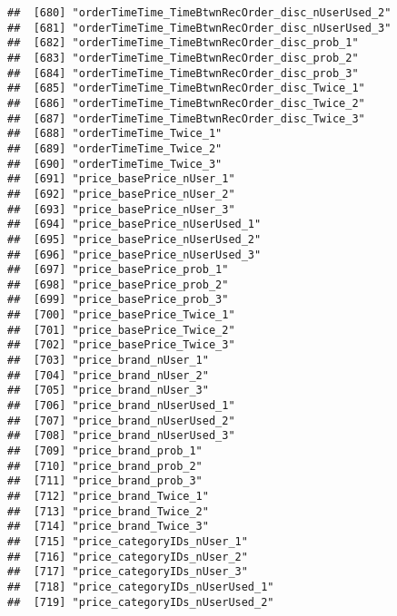 \documentclass[10pt]{report}
\begin{document}
\begin{verbatim}
##  [680] "orderTimeTime_TimeBtwnRecOrder_disc_nUserUsed_2"      
##  [681] "orderTimeTime_TimeBtwnRecOrder_disc_nUserUsed_3"      
##  [682] "orderTimeTime_TimeBtwnRecOrder_disc_prob_1"           
##  [683] "orderTimeTime_TimeBtwnRecOrder_disc_prob_2"           
##  [684] "orderTimeTime_TimeBtwnRecOrder_disc_prob_3"           
##  [685] "orderTimeTime_TimeBtwnRecOrder_disc_Twice_1"          
##  [686] "orderTimeTime_TimeBtwnRecOrder_disc_Twice_2"          
##  [687] "orderTimeTime_TimeBtwnRecOrder_disc_Twice_3"          
##  [688] "orderTimeTime_Twice_1"                                
##  [689] "orderTimeTime_Twice_2"                                
##  [690] "orderTimeTime_Twice_3"                                
##  [691] "price_basePrice_nUser_1"                              
##  [692] "price_basePrice_nUser_2"                              
##  [693] "price_basePrice_nUser_3"                              
##  [694] "price_basePrice_nUserUsed_1"                          
##  [695] "price_basePrice_nUserUsed_2"                          
##  [696] "price_basePrice_nUserUsed_3"                          
##  [697] "price_basePrice_prob_1"                               
##  [698] "price_basePrice_prob_2"                               
##  [699] "price_basePrice_prob_3"                               
##  [700] "price_basePrice_Twice_1"                              
##  [701] "price_basePrice_Twice_2"                              
##  [702] "price_basePrice_Twice_3"                              
##  [703] "price_brand_nUser_1"                                  
##  [704] "price_brand_nUser_2"                                  
##  [705] "price_brand_nUser_3"                                  
##  [706] "price_brand_nUserUsed_1"                              
##  [707] "price_brand_nUserUsed_2"                              
##  [708] "price_brand_nUserUsed_3"                              
##  [709] "price_brand_prob_1"                                   
##  [710] "price_brand_prob_2"                                   
##  [711] "price_brand_prob_3"                                   
##  [712] "price_brand_Twice_1"                                  
##  [713] "price_brand_Twice_2"                                  
##  [714] "price_brand_Twice_3"                                  
##  [715] "price_categoryIDs_nUser_1"                            
##  [716] "price_categoryIDs_nUser_2"                            
##  [717] "price_categoryIDs_nUser_3"                            
##  [718] "price_categoryIDs_nUserUsed_1"                        
##  [719] "price_categoryIDs_nUserUsed_2"                        

\end{verbatim}
\end{document}
